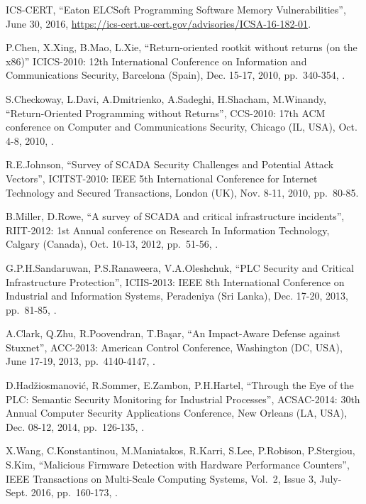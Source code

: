 \begin{thebibliography}{99}
ICS-CERT,
``Eaton ELCSoft Programming Software Memory Vulnerabilities'',
June 30, 2016,
\url{https://ics-cert.us-cert.gov/advisories/ICSA-16-182-01}.

P.Chen, X.Xing, B.Mao, L.Xie,
``Return-oriented rootkit without returns (on the x86)''
ICICS-2010: 12th International Conference on Information and Communications Security,
Barcelona (Spain), Dec. 15-17, 2010,
pp.\ 340-354,
.

S.Checkoway, L.Davi, A.Dmitrienko, A.Sadeghi, H.Shacham, M.Winandy,
``Return-Oriented Programming without Returns'',
CCS-2010: 17th ACM conference on Computer and Communications Security,
Chicago (IL, USA), Oct. 4-8, 2010,
.

R.E.Johnson,
``Survey of SCADA Security Challenges and Potential Attack Vectors'',
ICITST-2010: IEEE 5th International Conference for Internet Technology and Secured Transactions,
London (UK), Nov. 8-11, 2010,
pp.\ 80-85.

B.Miller, D.Rowe,
``A survey of SCADA and critical infrastructure incidents'',
RIIT-2012: 1st Annual conference on Research In Information Technology,
Calgary (Canada), Oct. 10-13, 2012,
pp.\ 51-56,
.

G.P.H.Sandaruwan, P.S.Ranaweera, V.A.Oleshchuk,
``PLC Security and Critical Infrastructure Protection'',
ICIIS-2013: IEEE 8th International Conference on Industrial and Information Systems,
Peradeniya (Sri Lanka), Dec. 17-20, 2013,
pp.\ 81-85,
.

A.Clark, Q.Zhu, R.Poovendran, T.Başar,
``An Impact-Aware Defense against Stuxnet'',
ACC-2013: American Control Conference,
Washington (DC, USA), June 17-19, 2013,
pp.\ 4140-4147,
.

D.Hadžiosmanović, R.Sommer, E.Zambon, P.H.Hartel,
``Through the Eye of the PLC: Semantic Security Monitoring for Industrial Processes'',
ACSAC-2014: 30th Annual Computer Security Applications Conference,
New Orleans (LA, USA), Dec. 08-12, 2014,
pp.\ 126-135,
.

X.Wang, C.Konstantinou, M.Maniatakos, R.Karri, S.Lee, P.Robison, P.Stergiou, S.Kim,
``Malicious Firmware Detection with Hardware Performance Counters'',
IEEE Transactions on Multi-Scale Computing Systems,
Vol.\ 2, Issue 3,
July-Sept. 2016,
pp.\ 160-173,
.


\end{thebibliography}
